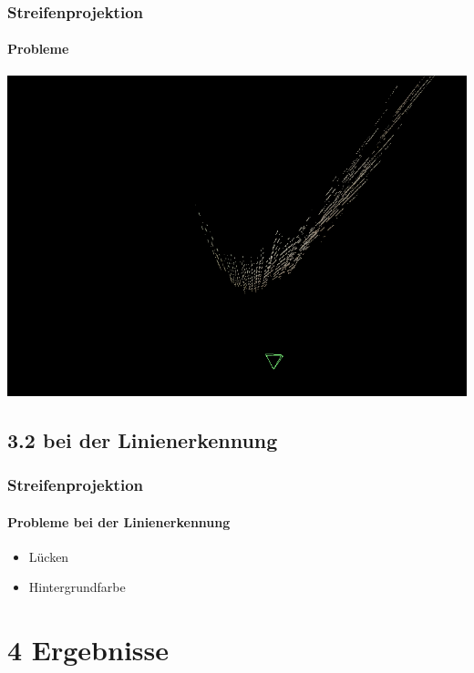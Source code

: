 \documentclass{beamer}
\begin{document}
\begin{frame}
	\frametitle{Streifenprojektion}
	\framesubtitle{Probleme}

	\includegraphics[width=\linewidth]{includes/krumm.png}

\end{frame}

\subsection{3.2 \hspace{5px} bei der Linienerkennung}
\begin{frame}
	\frametitle{Streifenprojektion}
	\framesubtitle{Probleme bei der Linienerkennung}

	\begin{itemize}
		\item Lücken
		\item Hintergrundfarbe
	\end{itemize}

\end{frame}

\section{4 \hspace{5px} Ergebnisse}
\end{document}
